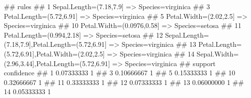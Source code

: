 \begin{Schunk}
% --begin: "casestudy-assoc-arules-view"
\begin{Soutput}
##                                                                        rules
## 1                           {Sepal.Length=(7.18,7.9]} => {Species=virginica}
## 3                          {Petal.Length=(5.72,6.91]} => {Species=virginica}
## 5                            {Petal.Width=(2.02,2.5]} => {Species=virginica}
## 10                           {Petal.Width=(0.0976,0.58]} => {Species=setosa}
## 11                           {Petal.Length=(0.994,2.18]} => {Species=setosa}
## 12 {Sepal.Length=(7.18,7.9],Petal.Length=(5.72,6.91]} => {Species=virginica}
## 13  {Petal.Length=(5.72,6.91],Petal.Width=(2.02,2.5]} => {Species=virginica}
## 14 {Sepal.Width=(2.96,3.44],Petal.Length=(5.72,6.91]} => {Species=virginica}
##       support confidence
## 1  0.07333333          1
## 3  0.10666667          1
## 5  0.15333333          1
## 10 0.32666667          1
## 11 0.33333333          1
## 12 0.07333333          1
## 13 0.06000000          1
## 14 0.05333333          1
\end{Soutput}
%
% --end: "casestudy-assoc-arules-view"
\end{Schunk}
